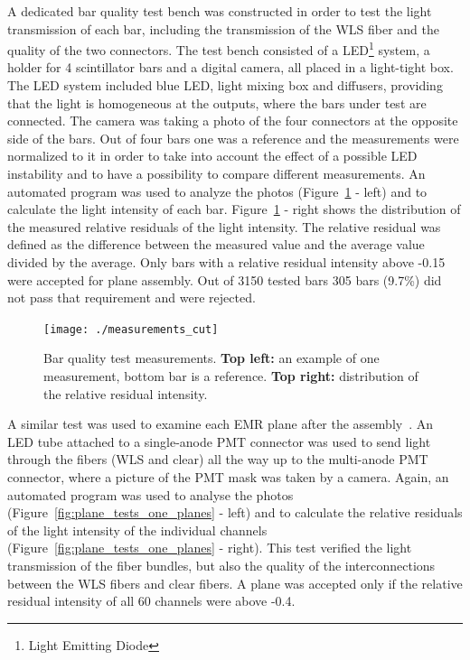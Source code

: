 \documentclass[a4paper,11pt]{article}
\begin{document}
A dedicated bar quality test bench was constructed in order to test the light transmission of each bar, including the transmission of the WLS fiber and the
quality of the two connectors. The test bench consisted of a LED\footnote{Light Emitting Diode} system, a holder for 4 scintillator bars and a digital camera,
all placed in a light-tight box. The LED system included blue LED, light mixing box and diffusers, providing that the light is homogeneous at the outputs,
where the bars under test are connected. The camera was taking a photo of the four connectors at the opposite side of the bars. Out of four bars one was a
reference and the measurements were normalized to it in order to take into account the effect of a possible LED instability and to have a possibility to
compare different measurements. An automated program was used to analyze the photos (Figure~\ref{fig:measurements} - left) and to calculate the light
intensity of each bar. Figure~\ref{fig:measurements} - right shows the distribution of the measured relative residuals of the light intensity. The relative
residual was defined as the difference between the measured value and the average value divided by the average. Only bars with a relative residual
intensity above -0.15 were accepted for plane assembly. Out of 3150 tested bars 305 bars (9.7\%) did not pass that requirement and were rejected.

\begin{figure}[htb]
 \centering
 \texttt{[image: ./measurements\_cut]}
 \caption[Bar quality test measurements]{Bar quality test measurements. {\bf Top left:} an example of one measurement, bottom bar is a reference. {\bf Top
 right:} distribution of the relative residual intensity.}
 \label{fig:measurements}
\end{figure}

A similar test was used to examine each EMR plane after the assembly~\cite{emr_elquality}. An LED tube attached to a single-anode PMT connector was used to send light through
the fibers (WLS and clear) all the way up to the multi-anode PMT connector, where a picture of the PMT mask was taken by a camera. Again,  an automated
program was used to analyse the photos (Figure~\ref{fig:plane_tests_one_planes} - left) and to calculate the relative residuals of the light intensity
of the individual channels (Figure~\ref{fig:plane_tests_one_planes} - right). This test verified the light transmission of the fiber bundles, but also
the quality of the interconnections between the WLS fibers and clear fibers. A plane was accepted only if the relative residual intensity of all 60
channels were above -0.4.
\end{document}
